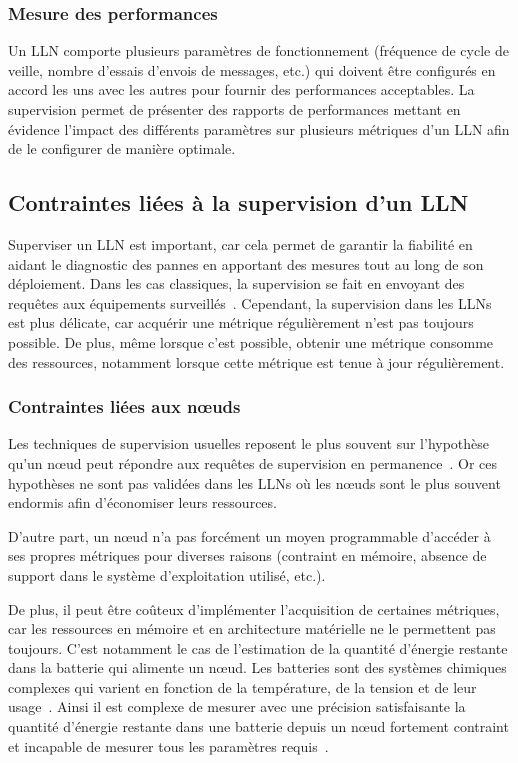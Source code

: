 \subsubsection{Mesure des performances}

Un \ac{LLN} comporte plusieurs paramètres de fonctionnement (fréquence de cycle de veille, nombre d'essais d'envois de messages, etc.) qui doivent être configurés en accord les uns avec les autres pour fournir des performances acceptables.
La supervision permet de présenter des rapports de performances mettant en évidence l'impact des différents paramètres sur plusieurs métriques d'un \ac{LLN} afin de le configurer de manière optimale.

\subsection{Contraintes liées à la supervision d'un \ac{LLN}}
\label{supervision:motivations}

Superviser un \ac{LLN} est important, car cela permet de garantir la fiabilité en aidant le diagnostic des pannes en apportant des mesures tout au long de son déploiement.
Dans les cas classiques, la supervision se fait en envoyant des requêtes aux équipements surveillés~\cite{ligus2012effective}.
Cependant, la supervision dans les \ac{LLN}s est plus délicate, car acquérir une métrique régulièrement n'est pas toujours possible.
De plus, même lorsque c'est possible, obtenir une métrique consomme des ressources, notamment lorsque cette métrique est tenue à jour régulièrement.

\subsubsection{Contraintes liées aux nœuds}

Les techniques de supervision usuelles reposent le plus souvent sur l'hypothèse qu'un nœud peut répondre aux requêtes de supervision en permanence~\cite{ward2014observing}.
Or ces hypothèses ne sont pas validées dans les \ac{LLN}s où les nœuds sont le plus souvent endormis afin d'économiser leurs ressources.

D'autre part, un nœud n'a pas forcément un moyen programmable d'accéder à ses propres métriques pour diverses raisons (contraint en mémoire, absence de support dans le système d'exploitation utilisé, etc.).

De plus, il peut être coûteux d'implémenter l'acquisition de certaines métriques, car les ressources en mémoire et en architecture matérielle ne le permettent pas toujours.
C'est notamment le cas de l'estimation de la quantité d'énergie restante dans la batterie qui alimente un nœud.
Les batteries sont des systèmes chimiques complexes qui varient en fonction de la température, de la tension et de leur usage~\cite{buchli2013battery,kerasiotis2010battery}.
Ainsi il est complexe de mesurer avec une précision satisfaisante la quantité d'énergie restante dans une batterie depuis un nœud fortement contraint et incapable de mesurer tous les paramètres requis~\cite{nataf2012online}.

